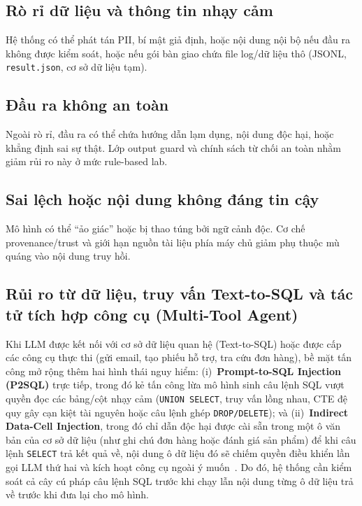 \subsection{Rò rỉ dữ liệu và thông tin nhạy cảm}

Hệ thống có thể phát tán PII, bí mật giả định, hoặc nội dung nội bộ nếu đầu ra không được kiểm soát, hoặc nếu gói bàn giao chứa file log/dữ liệu thô (JSONL, \texttt{result.\allowbreak json}, cơ sở dữ liệu tạm).

\subsection{Đầu ra không an toàn}

Ngoài rò rỉ, đầu ra có thể chứa hướng dẫn lạm dụng, nội dung độc hại, hoặc khẳng định sai sự thật. Lớp output guard và chính sách từ chối an toàn nhằm giảm rủi ro này ở mức rule-based lab.

\subsection{Sai lệch hoặc nội dung không đáng tin cậy}

Mô hình có thể ``ảo giác'' hoặc bị thao túng bởi ngữ cảnh độc. Cơ chế provenance/trust và giới hạn nguồn tài liệu phía máy chủ giảm phụ thuộc mù quáng vào nội dung truy hồi.

\subsection{Rủi ro từ dữ liệu, truy vấn Text-to-SQL và tác tử tích hợp công cụ (Multi-Tool Agent)}

Khi LLM được kết nối với cơ sở dữ liệu quan hệ (Text-to-SQL) hoặc được cấp các công cụ thực thi (gửi email, tạo phiếu hỗ trợ, tra cứu đơn hàng), bề mặt tấn công mở rộng thêm hai hình thái nguy hiểm: (i)~\textbf{Prompt-to-SQL Injection (P2SQL)} trực tiếp, trong đó kẻ tấn công lừa mô hình sinh câu lệnh SQL vượt quyền đọc các bảng/cột nhạy cảm (\texttt{UNION SELECT}, truy vấn lồng nhau, CTE đệ quy gây cạn kiệt tài nguyên hoặc câu lệnh ghép \texttt{DROP/\allowbreak DELETE}); và (ii)~\textbf{Indirect Data-Cell Injection}, trong đó chỉ dẫn độc hại được cài sẵn trong một ô văn bản của cơ sở dữ liệu (như ghi chú đơn hàng hoặc đánh giá sản phẩm) để khi câu lệnh \texttt{SELECT} trả kết quả về, nội dung ô dữ liệu đó sẽ chiếm quyền điều khiển lần gọi LLM thứ hai và kích hoạt công cụ ngoài ý muốn~\cite{zhan2024injecagent}. Do đó, hệ thống cần kiểm soát cả cây cú pháp câu lệnh SQL trước khi chạy lẫn nội dung từng ô dữ liệu trả về trước khi đưa lại cho mô hình.

